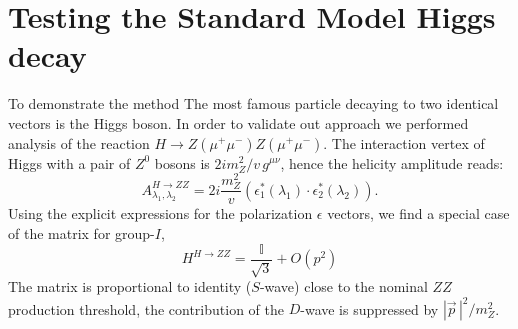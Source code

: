 \documentclass[prd,preprintnumbers,floatfix,
nofootinbib,superscriptaddress]{revtex4}
\newcommand{\I}{\ensuremath{I}}
\begin{document}
\section{Testing the Standard Model Higgs decay} \label{sec:higgs}
To demonstrate the method
The most famous particle decaying to two identical vectors is the Higgs boson.
In order to validate out approach we performed analysis of the reaction $H\to Z(\mu^+\mu^-)Z(\mu^+\mu^-)$.
The interaction vertex of Higgs with a pair of $Z^0$ bosons is $2i m_Z^2/v\,g^{\mu\nu}$,
hence the helicity amplitude reads:
\begin{equation} \label{eq:HZZ}
  A^{H\to ZZ}_{\lambda_1,\lambda_2} = 2i\frac{m_Z^2}{v} (\epsilon_1^*(\lambda_1)\cdot\epsilon_2^*(\lambda_2)).
\end{equation}
Using the explicit expressions for the polarization $\epsilon$ vectors,
we find a special case of the matrix for group-$\I$,
\begin{equation} \label{eq:H2ZZ}
  H^{H\to ZZ} = \frac{\mathbb{I}}{\sqrt{3}} + O(p^2)
\end{equation}
The matrix is proportional to identity ($S$-wave) close to the nominal $ZZ$ production threshold,
the contribution of the $D$-wave is suppressed by $|\vec p\,|^2/m_Z^2$.
\end{document}
